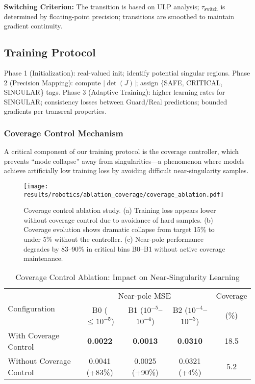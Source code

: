 \documentclass[twoside,11pt]{article}
\begin{document}
\textbf{Switching Criterion:} The transition is based on ULP analysis; $\tau_{\mathrm{switch}}$ is determined by floating-point precision; transitions are smoothed to maintain gradient continuity.
\subsection{Training Protocol}
Phase 1 (Initialization): real-valued init; identify potential singular regions.
Phase 2 (Precision Mapping): compute $|\det(J)|$; assign \{SAFE, CRITICAL, SINGULAR\} tags.
Phase 3 (Adaptive Training): higher learning rates for SINGULAR; consistency losses between Guard/Real predictions; bounded gradients per transreal properties.

\subsubsection{Coverage Control Mechanism}
A critical component of our training protocol is the coverage controller, which prevents ``mode collapse'' away from singularities---a phenomenon where models achieve artificially low training loss by avoiding difficult near-singularity samples.

\begin{figure}[t]
\centering
\texttt{[image: results/robotics/ablation\_coverage/coverage\_ablation.pdf]}
\caption{Coverage control ablation study. (a) Training loss appears lower without coverage control due to avoidance of hard samples. (b) Coverage evolution shows dramatic collapse from target 15\% to under 5\% without the controller. (c) Near-pole performance degrades by 83--90\% in critical bins B0--B1 without active coverage maintenance.}
\label{fig:coverage_ablation}
\end{figure}

\begin{table}[t]
\centering
\caption{Coverage Control Ablation: Impact on Near-Singularity Learning}
\label{tab:coverage_ablation}
\begin{tabular}{lcccc}
\toprule
\multirow{2}{*}{Configuration} & \multicolumn{3}{c}{Near-pole MSE} & Coverage \\
\cmidrule(lr){2-4} \cmidrule(lr){5-5}
 & B0 ($\leq 10^{-5}$) & B1 ($10^{-5}$--$10^{-4}$) & B2 ($10^{-4}$--$10^{-3}$) & (\%) \\
\midrule
With Coverage Control    & \textbf{0.0022} & \textbf{0.0013} & \textbf{0.0310} & 18.5 \\
Without Coverage Control & 0.0041 (+83\%) & 0.0025 (+90\%) & 0.0321 (+4\%) & 5.2 \\
\bottomrule
\end{tabular}
\end{table}
\end{document}
